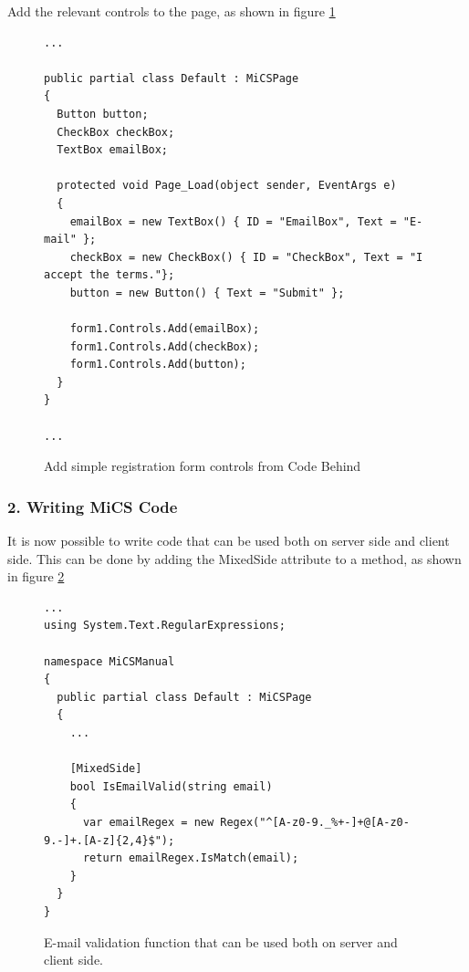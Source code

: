 Add the relevant controls to the page, as shown in figure \ref{fig:mics_add_controls}

\begin{figure}[H]
\begin{lstlisting}[language=CSharp,classoffset=1,morekeywords={Default,MiCSPage,Button,CheckBox,TextBox,EventArgs,ClientSide,InputElement,Document,CheckBoxElement,Window,MixedSide,Regex}]
...

public partial class Default : MiCSPage
{
  Button button;
  CheckBox checkBox;
  TextBox emailBox;

  protected void Page_Load(object sender, EventArgs e)
  {
    emailBox = new TextBox() { ID = "EmailBox", Text = "E-mail" };
    checkBox = new CheckBox() { ID = "CheckBox", Text = "I accept the terms."};
    button = new Button() { Text = "Submit" };

    form1.Controls.Add(emailBox);
    form1.Controls.Add(checkBox);
    form1.Controls.Add(button);
  }
}

...
\end{lstlisting}
\caption{Add simple registration form controls from Code Behind}
\label{fig:mics_add_controls}
\end{figure}



\subsubsection{2. Writing MiCS Code} %
\label{ssub:writing_mics_code}
It is now possible to write code that can be used both on server side and client side. This can be done by adding the MixedSide attribute to a method, as shown in figure \ref{fig:write_mics_code}

\begin{figure}[H]
\begin{lstlisting}[language=CSharp,classoffset=1,morekeywords={Default,MiCSPage,Button,CheckBox,TextBox,EventArgs,ClientSide,InputElement,Document,CheckBoxElement,Window,MixedSide,Regex}]
...
using System.Text.RegularExpressions;

namespace MiCSManual
{    
  public partial class Default : MiCSPage
  {
    ...

    [MixedSide]
    bool IsEmailValid(string email)
    {
      var emailRegex = new Regex("^[A-z0-9._%+-]+@[A-z0-9.-]+.[A-z]{2,4}$");
      return emailRegex.IsMatch(email);
    }
  }
}
\end{lstlisting}
\caption{E-mail validation function that can be used both on server and client side.}
\label{fig:write_mics_code}
\end{figure}


